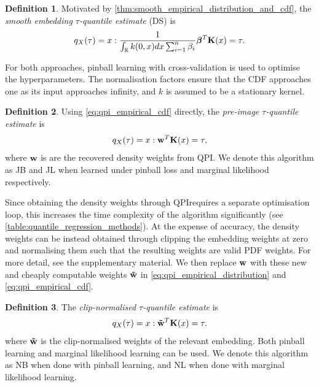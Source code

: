 \documentclass[twoside]{article} \usepackage{aistats2017}
\theoremstyle{definition}
\newtheorem{definition}{Definition}[section]
\theoremstyle{theorem}
\newcommand{\rv}[1]{{#1}}
\newcommand{\qpi}{QPI}
\begin{document}
	\theoremstyle{definition}
	\begin{definition}
		Motivated by \cref{thm:smooth_empirical_distribution_and_cdf}, the \textit{smooth embedding $\tau$-quantile estimate} (DS) is
		\begin{equation}
		q_{\rv{X}}(\tau) = x : \frac{1}{\int_{\mathbb{R}} k(0, x) dx \sum_{i = 1}^{n} \beta_{i}} \bm{\beta}^{T} \bvec{K}(x) = \tau.
		\end{equation}	
	\end{definition}
	
	For both approaches, pinball learning with cross-validation is used to optimise the hyperparameters. The normalisation factors ensure that the CDF approaches one as its input approaches infinity, and $k$ is assumed to be a stationary kernel.

	\theoremstyle{definition}
	\begin{definition}
		Using \eqref{eq:qpi_empirical_cdf} directly, the \textit{pre-image $\tau$-quantile estimate} is
		\begin{equation}
			q_{\rv{X}}(\tau) = x : \bvec{w}^{T} \bvec{K}(x) = \tau,
		\end{equation}	
		where $\mathbf{w}$ is are the recovered density weights from QPI.
		We denote this algorithm as JB and JL when learned under pinball loss and marginal likelihood respectively.
	\end{definition}
	
	Since obtaining the density weights through \qpi\space requires a separate optimisation loop, this increases the time complexity of the algorithm significantly (see \cref{table:quantile_regression_methods}). At the expense of accuracy, the density weights can be instead obtained through clipping the embedding weights at zero and normalising them such that the resulting weights are valid PDF weights. For more detail, see the supplementary material. We then replace $\mathbf{w}$ with these new and cheaply computable weights $\mathbf{\tilde{w}}$ in \eqref{eq:qpi_empirical_distribution} and \eqref{eq:qpi_empirical_cdf}.
%
%

	\theoremstyle{definition}
	\begin{definition}
		The \textit{clip-normalised $\tau$-quantile estimate} is
		\begin{equation}
			q_{\rv{X}}(\tau) = x : \bvec{\tilde{w}}^{T} \bvec{K}(x) = \tau.
		\end{equation}
		where $\mathbf{\tilde{w}}$ is the clip-normalised weights of the relevant embedding.
		Both pinball learning and marginal likelihood learning can be used. We denote this algorithm as NB when done with pinball learning, and NL when done with marginal likelihood learning.
	\end{definition}	
	
\end{document}
